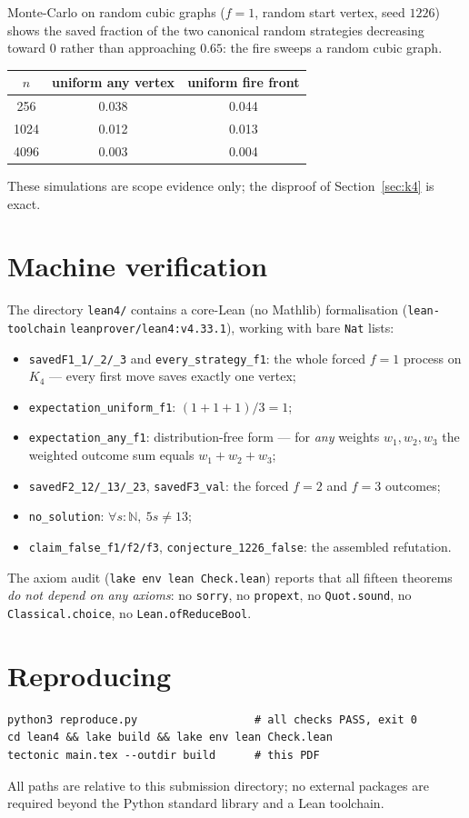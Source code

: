\documentclass[11pt]{article}
\theoremstyle{plain}
\begin{document}
Monte-Carlo on random cubic graphs ($f=1$, random start vertex, seed $1226$)
shows the saved fraction of the two canonical random strategies decreasing
toward $0$ rather than approaching $0.65$: the fire sweeps a random cubic
graph.

\begin{center}
\begin{tabular}{ccc}
\toprule
$n$ & uniform any vertex & uniform fire front\\
\midrule
256  & 0.038 & 0.044\\
1024 & 0.012 & 0.013\\
4096 & 0.003 & 0.004\\
\bottomrule
\end{tabular}
\end{center}

These simulations are scope evidence only; the disproof of
Section~\ref{sec:k4} is exact.

\section{Machine verification}

The directory \texttt{lean4/} contains a core-Lean (no Mathlib)
formalisation (\texttt{lean-toolchain} \texttt{leanprover/lean4:v4.33.1}),
working with bare \texttt{Nat} lists:

\begin{itemize}
\item \texttt{savedF1\_1/\_2/\_3} and \texttt{every\_strategy\_f1}: the
  whole forced $f=1$ process on $K_4$ --- every first move saves exactly one
  vertex;
\item \texttt{expectation\_uniform\_f1}: $(1+1+1)/3 = 1$;
\item \texttt{expectation\_any\_f1}: distribution-free form --- for \emph{any}
  weights $w_1,w_2,w_3$ the weighted outcome sum equals $w_1+w_2+w_3$;
\item \texttt{savedF2\_12/\_13/\_23}, \texttt{savedF3\_val}: the forced
  $f=2$ and $f=3$ outcomes;
\item \texttt{no\_solution}: $\forall s:\mathbb{N},\ 5s \ne 13$;
\item \texttt{claim\_false\_f1/f2/f3}, \texttt{conjecture\_1226\_false}: the
  assembled refutation.
\end{itemize}

The axiom audit (\texttt{lake env lean Check.lean}) reports that all fifteen
theorems \emph{do not depend on any axioms}: no \texttt{sorry}, no
\texttt{propext}, no \texttt{Quot.sound}, no \texttt{Classical.choice}, no
\texttt{Lean.ofReduceBool}.

\section{Reproducing}

\begin{verbatim}
python3 reproduce.py                  # all checks PASS, exit 0
cd lean4 && lake build && lake env lean Check.lean
tectonic main.tex --outdir build      # this PDF
\end{verbatim}
All paths are relative to this submission directory; no external packages
are required beyond the Python standard library and a Lean toolchain.
\end{document}
